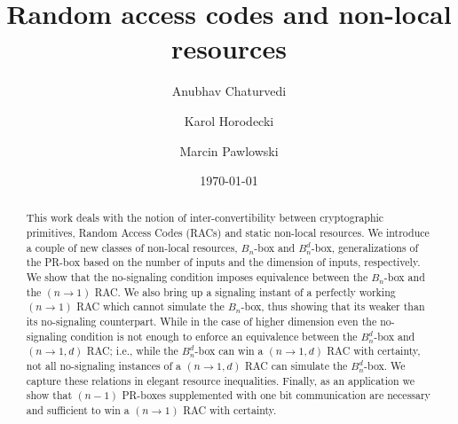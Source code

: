 \documentclass[%
 reprint,
 amsmath,amssymb,
 aps,
]{revtex4-1}
\begin{document}

\title{Random access codes and non-local resources }%

\author{Anubhav Chaturvedi}
\author{Karol Horodecki}
\author{Marcin Pawlowski}

\date{\today}%

\begin{abstract}
This work deals with the notion of inter-convertibility between cryptographic primitives, Random Access Codes (RACs) and static non-local resources. We introduce a couple of new classes of non-local resources, $B_n$-box and $B_n^d$-box, generalizations of the PR-box based on the number of inputs and the dimension of inputs, respectively. We show that the no-signaling condition imposes equivalence between the $B_n$-box and the $(n \rightarrow 1)$ RAC. We also bring up a signaling instant of a perfectly working $(n\rightarrow 1)$ RAC which cannot simulate the $B_n$-box, thus showing that its weaker than its no-signaling counterpart. While in the case of higher dimension even the no-signaling condition is not enough to enforce an equivalence between the $B_n^d$-box and $(n\rightarrow 1,d)$ RAC; i.e., while the $B_n^d$-box can win a $(n\rightarrow 1,d)$ RAC with certainty, not all no-signaling instances of a $(n\rightarrow 1,d)$ RAC can simulate the $B_n^d$-box. We capture these relations in elegant resource inequalities. Finally, as an application we show that $(n-1)$ PR-boxes supplemented with one bit communication are necessary and sufficient to win a $(n\rightarrow 1)$ RAC with certainty. 
\end{abstract}

\maketitle
\end{document}
